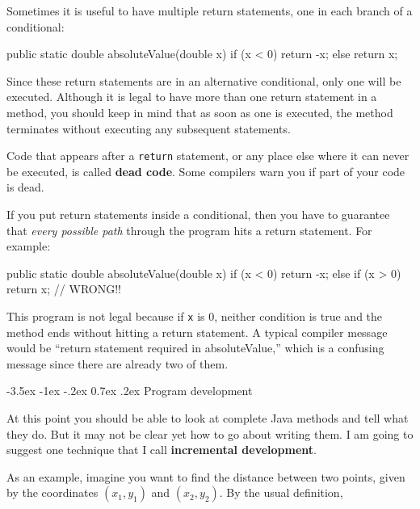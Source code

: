 \documentclass{book}
\makeatletter
\renewcommand{\section}{\@startsection 
    {section} {1} {0mm}%
    {-3.5ex \@plus -1ex \@minus -.2ex}%
    {0.7ex \@plus.2ex}%
    {\normalfont\Large\bfseries}}
\makeatother
\begin{document}

Sometimes it is useful to have multiple return
statements, one in each branch of a conditional:

\begin{verbatimtab}
  public static double absoluteValue(double x) {
    if (x < 0) {
      return -x;
    } else {
      return x;
    }
  }
\end{verbatimtab}
%
Since these return statements are in an alternative conditional,
only one will be executed.  Although it is legal to have more than one
return statement in a method, you should keep in mind
that as soon as one is executed, the method
terminates without executing any subsequent statements.

Code that appears after a {\tt return} statement, or any place else
where it can never be executed, is called {\bf dead code}.  Some
compilers warn you if part of your code is dead.


If you put return statements inside a conditional, then
you have to guarantee that {\em every possible path} through
the program hits a return statement.  For example:

\begin{verbatimtab}
  public static double absoluteValue(double x) {
    if (x < 0) {
      return -x;
    } else if (x > 0) {
      return x;
    }                          // WRONG!!
  }
\end{verbatimtab}
%
This program is not legal because if {\tt x} is 0,
neither condition is true and the method ends without hitting
a return statement.  A typical compiler message would be ``return
statement required in absoluteValue,'' which is a confusing message
since there are already two of them.


\section{Program development}
\label{distance}

At this point you should be able to look at complete Java methods
and tell what they do.  But it may not be clear yet how to go
about writing them.  I am going to suggest one technique that
I call {\bf incremental development}.


As an example, imagine you want to find the distance between
two points, given by the coordinates $(x_1, y_1)$ and
$(x_2, y_2)$.  By the usual definition,
\end{document}
